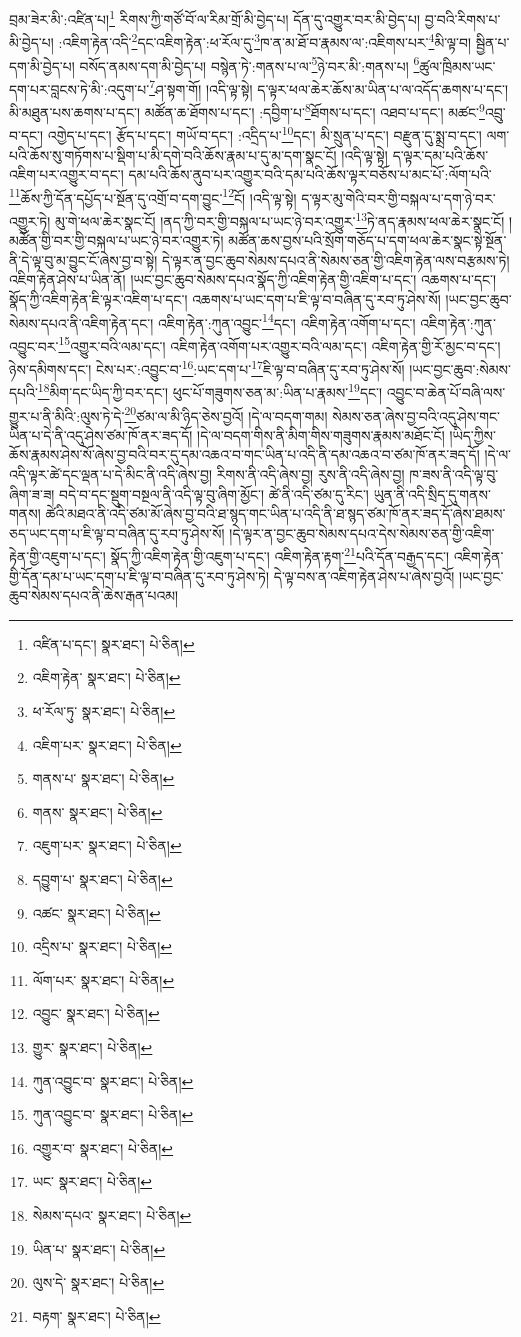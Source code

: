 བྲམ་ཟེར་མི་:འཛིན་པ།\footnote{འཛིན་པ་དང་།  སྣར་ཐང་།  པེ་ཅིན། } རིགས་ཀྱི་གཙོ་བོ་ལ་རིམ་གྲོ་མི་བྱེད་པ། དོན་དུ་འགྱུར་བར་མི་བྱེད་པ། བྱ་བའི་རིགས་པ་མི་བྱེད་པ། :འཇིག་རྟེན་འདི་\footnote{འཇིག་རྟེན་  སྣར་ཐང་།  པེ་ཅིན། }དང་འཇིག་རྟེན་:ཕ་རོལ་དུ་\footnote{ཕ་རོལ་ཏུ་  སྣར་ཐང་།  པེ་ཅིན། }ཁ་ན་མ་ཐོ་བ་རྣམས་ལ་:འཇིགས་པར་\footnote{འཇིག་པར་  སྣར་ཐང་།  པེ་ཅིན། }མི་ལྟ་བ། སྦྱིན་པ་དག་མི་བྱེད་པ། བསོད་ནམས་དག་མི་བྱེད་པ། བསྙེན་ཏེ་:གནས་པ་ལ་\footnote{གནས་པ་  སྣར་ཐང་།  པེ་ཅིན། }ཉེ་བར་མི་:གནས་པ། \footnote{གནས་  སྣར་ཐང་།  པེ་ཅིན། }ཚུལ་ཁྲིམས་ཡང་དག་པར་བླངས་ཏེ་མི་:འདུག་པ་\footnote{འཇུག་པར་  སྣར་ཐང་།  པེ་ཅིན། }ཤ་སྟག་གོ། །འདི་ལྟ་སྟེ། ད་ལྟར་ཕལ་ཆེར་ཆོས་མ་ཡིན་པ་ལ་འདོད་ཆགས་པ་དང་། མི་མཐུན་པས་ཆགས་པ་དང་། མཚོན་ཆ་ཐོགས་པ་དང་། :དབྱིག་པ་\footnote{དབྱུག་པ་  སྣར་ཐང་།  པེ་ཅིན། }ཐོགས་པ་དང་། འཐབ་པ་དང་། མཚང་\footnote{འཚང་  སྣར་ཐང་།  པེ་ཅིན། }འབྲུ་བ་དང་། འགྱེད་པ་དང་། རྩོད་པ་དང་། གཡོ་བ་དང་། :འདྲིད་པ་\footnote{འདྲིས་པ་  སྣར་ཐང་།  པེ་ཅིན། }དང་། མི་སྲུན་པ་དང་། བརྫུན་དུ་སྨྲ་བ་དང་། ལག་པའི་ཆོས་སུ་གཏོགས་པ་སྡིག་པ་མི་དགེ་བའི་ཆོས་རྣམ་པ་དུ་མ་དག་སྣང་ངོ། །འདི་ལྟ་སྟེ། ད་ལྟར་དམ་པའི་ཆོས་འཇིག་པར་འགྱུར་བ་དང་། དམ་པའི་ཆོས་ནུབ་པར་འགྱུར་བའི་དམ་པའི་ཆོས་ལྟར་བཅོས་པ་མང་པོ་:ལོག་པའི་\footnote{ལོག་པར་  སྣར་ཐང་།  པེ་ཅིན། }ཆོས་ཀྱི་དོན་དཔྱོད་པ་སྔོན་དུ་འགྲོ་བ་དག་བྱུང་\footnote{འབྱུང་  སྣར་ཐང་།  པེ་ཅིན། }ངོ། །འདི་ལྟ་སྟེ། ད་ལྟར་མུ་གེའི་བར་གྱི་བསྐལ་པ་དག་ཉེ་བར་འགྱུར་ཏེ། མུ་གེ་ཕལ་ཆེར་སྣང་ངོ། །ནད་ཀྱི་བར་གྱི་བསྐལ་པ་ཡང་ཉེ་བར་འགྱུར་\footnote{གྱུར་  སྣར་ཐང་།  པེ་ཅིན། }ཏེ་ནད་རྣམས་ཕལ་ཆེར་སྣང་ངོ། །མཚོན་གྱི་བར་གྱི་བསྐལ་པ་ཡང་ཉེ་བར་འགྱུར་ཏེ། མཚོན་ཆས་བྱས་པའི་སྲོག་གཅོད་པ་དག་ཕལ་ཆེར་སྣང་སྟེ་སྔོན་ནི་དེ་ལྟ་བུ་མ་བྱུང་ངོ་ཞེས་བྱ་བ་སྟེ། དེ་ལྟར་ན་བྱང་ཆུབ་སེམས་དཔའ་ནི་སེམས་ཅན་གྱི་འཇིག་རྟེན་ལས་བརྩམས་ཏེ། འཇིག་རྟེན་ཤེས་པ་ཡིན་ནོ། །ཡང་བྱང་ཆུབ་སེམས་དཔའ་སྣོད་ཀྱི་འཇིག་རྟེན་གྱི་འཇིག་པ་དང་། འཆགས་པ་དང་། སྣོད་ཀྱི་འཇིག་རྟེན་ཇི་ལྟར་འཇིག་པ་དང་། འཆགས་པ་ཡང་དག་པ་ཇི་ལྟ་བ་བཞིན་དུ་རབ་ཏུ་ཤེས་སོ། །ཡང་བྱང་ཆུབ་སེམས་དཔའ་ནི་འཇིག་རྟེན་དང་། འཇིག་རྟེན་:ཀུན་འབྱུང་\footnote{ཀུན་འབྱུང་བ་  སྣར་ཐང་།  པེ་ཅིན། }དང་། འཇིག་རྟེན་འགོག་པ་དང་། འཇིག་རྟེན་:ཀུན་འབྱུང་བར་\footnote{ཀུན་འབྱུང་བ་  སྣར་ཐང་།  པེ་ཅིན། }འགྱུར་བའི་ལམ་དང་། འཇིག་རྟེན་འགོག་པར་འགྱུར་བའི་ལམ་དང་། འཇིག་རྟེན་གྱི་རོ་མྱང་བ་དང་། ཉེས་དམིགས་དང་། ངེས་པར་:འབྱུང་བ་\footnote{འགྱུར་བ་  སྣར་ཐང་།  པེ་ཅིན། }:ཡང་དག་པ་\footnote{ཡང་  སྣར་ཐང་།  པེ་ཅིན། }ཇི་ལྟ་བ་བཞིན་དུ་རབ་ཏུ་ཤེས་སོ། །ཡང་བྱང་ཆུབ་:སེམས་དཔའི་\footnote{སེམས་དཔའ་  སྣར་ཐང་།  པེ་ཅིན། }མིག་དང་ཡིད་ཀྱི་བར་དང་། ཕུང་པོ་གཟུགས་ཅན་མ་:ཡིན་པ་རྣམས་\footnote{ཡིན་པ་  སྣར་ཐང་།  པེ་ཅིན། }དང་། འབྱུང་བ་ཆེན་པོ་བཞི་ལས་གྱུར་པ་ནི་མིའི་:ལུས་ཏེ་དེ་\footnote{ལུས་དེ་  སྣར་ཐང་།  པེ་ཅིན། }ཙམ་ལ་མི་ཉིད་ཅེས་བྱའོ། །དེ་ལ་བདག་གམ། སེམས་ཅན་ཞེས་བྱ་བའི་འདུ་ཤེས་གང་ཡིན་པ་དེ་ནི་འདུ་ཤེས་ཙམ་ཁོ་ནར་ཟད་དོ། །དེ་ལ་བདག་གིས་ནི་མིག་གིས་གཟུགས་རྣམས་མཐོང་ངོ། །ཡིད་ཀྱིས་ཆོས་རྣམས་ཤེས་སོ་ཞེས་བྱ་བའི་བར་དུ་དམ་འཆའ་བ་གང་ཡིན་པ་འདི་ནི་དམ་འཆའ་བ་ཙམ་ཁོ་ནར་ཟད་དོ། །དེ་ལ་འདི་ལྟར་ཚེ་དང་ལྡན་པ་དེ་མིང་ནི་འདི་ཞེས་བྱ། རིགས་ནི་འདི་ཞེས་བྱ། རུས་ནི་འདི་ཞེས་བྱ། ཁ་ཟས་ནི་འདི་ལྟ་བུ་ཞིག་ཟ་ཟ། བདེ་བ་དང་སྡུག་བསྔལ་ནི་འདི་ལྟ་བུ་ཞིག་མྱོང་། ཚེ་ནི་འདི་ཙམ་དུ་རིང་། ཡུན་ནི་འདི་སྲིད་དུ་གནས་གནས། ཚེའི་མཐའ་ནི་འདི་ཙམ་མོ་ཞེས་བྱ་བའི་ཐ་སྙད་གང་ཡིན་པ་འདི་ནི་ཐ་སྙད་ཙམ་ཁོ་ནར་ཟད་དོ་ཞེས་ཐམས་ཅད་ཡང་དག་པ་ཇི་ལྟ་བ་བཞིན་དུ་རབ་ཏུ་ཤེས་སོ། །དེ་ལྟར་ན་བྱང་ཆུབ་སེམས་དཔའ་དེས་སེམས་ཅན་གྱི་འཇིག་རྟེན་གྱི་འཇུག་པ་དང་། སྣོད་ཀྱི་འཇིག་རྟེན་གྱི་འཇུག་པ་དང་། འཇིག་རྟེན་རྟག་\footnote{བརྟག་  སྣར་ཐང་།  པེ་ཅིན། }པའི་དོན་བརྒྱད་དང་། འཇིག་རྟེན་གྱི་དོན་དམ་པ་ཡང་དག་པ་ཇི་ལྟ་བ་བཞིན་དུ་རབ་ཏུ་ཤེས་ཏེ། དེ་ལྟ་བས་ན་འཇིག་རྟེན་ཤེས་པ་ཞེས་བྱའོ། །ཡང་བྱང་ཆུབ་སེམས་དཔའ་ནི་ཆེས་རྒན་པའམ། 